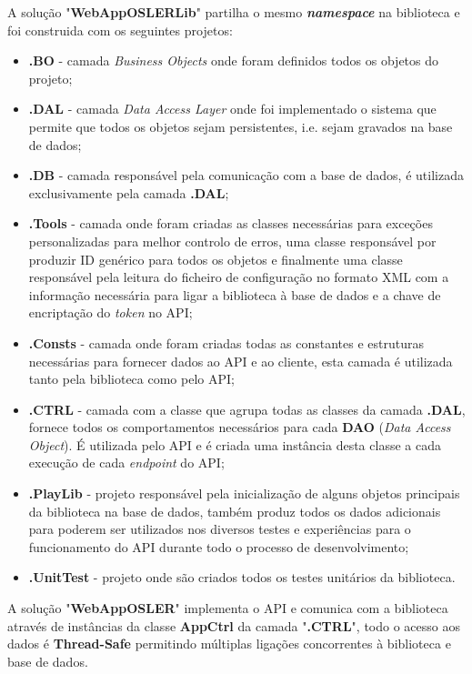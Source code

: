 A solução "\textbf{WebAppOSLERLib}" partilha o mesmo \textbf{\textit{namespace}} na biblioteca e foi construida com os seguintes projetos:
\begin{itemize}
	\item \textbf{.BO} - camada \textit{Business Objects} onde foram definidos todos os objetos do projeto;
	\item \textbf{.DAL} - camada \textit{Data Access Layer} onde foi implementado o sistema que permite que todos os objetos sejam persistentes, i.e. sejam gravados na base de dados;
	\item \textbf{.DB} - camada responsável pela comunicação com a base de dados, é utilizada exclusivamente pela camada \textbf{.DAL};
	\item \textbf{.Tools} - camada onde foram criadas as classes necessárias para exceções personalizadas para melhor controlo de erros, uma classe responsável por produzir ID genérico para todos os objetos e finalmente uma classe responsável pela leitura do ficheiro de configuração no formato XML com a informação necessária para ligar a biblioteca à base de dados e a chave de encriptação do \textit{token} no API;
	\item \textbf{.Consts} - camada onde foram criadas todas as constantes e estruturas necessárias para fornecer dados ao API e ao cliente, esta camada é utilizada tanto pela biblioteca como pelo API;
	\item \textbf{.CTRL} - camada com a classe que agrupa todas as classes da camada \textbf{.DAL}, fornece todos os comportamentos necessários para cada \textbf{DAO} (\textit{Data Access Object}). É utilizada pelo API e é criada uma instância desta classe a cada execução de cada \textit{endpoint} do API;
	\item \textbf{.PlayLib} - projeto responsável pela inicialização de alguns objetos principais da biblioteca na base de dados, também produz todos os dados adicionais para poderem ser utilizados nos diversos testes e experiências para o funcionamento do API durante todo o processo de desenvolvimento;
	\item \textbf{.UnitTest} - projeto onde são criados todos os testes unitários da biblioteca.
\end{itemize}

A solução "\textbf{WebAppOSLER}" implementa o API e comunica com a biblioteca através de instâncias da classe \textbf{AppCtrl} da camada "\textbf{.CTRL}", todo o acesso aos dados é \textbf{Thread-Safe} permitindo múltiplas ligações concorrentes à biblioteca e base de dados.




